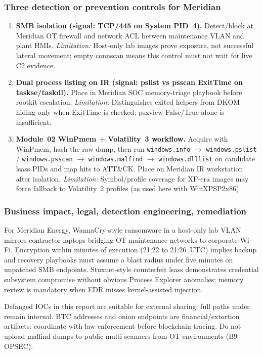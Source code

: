 \documentclass[11pt,letterpaper]{article}
\newcommand{\winpath}[1]{\texttt{\seqsplit{#1}}}
\begin{document}
\subsubsection*{Three detection or prevention controls for Meridian}
\begin{enumerate}
\item \textbf{SMB isolation (signal: TCP/445 on System PID~4).}
 Detect/block at Meridian OT firewall and network ACL
between maintenance VLAN and plant HMIs. \textit{Limitation:} Host-only lab images prove exposure, not successful
lateral movement; empty connscan means this control must not wait for live C2 evidence.
\item \textbf{Dual process listing on IR (signal: pslist vs psscan ExitTime on taskse/taskdl).}
 Place in Meridian SOC
memory-triage playbook before rootkit escalation. \textit{Limitation:} Distinguishes exited helpers from DKOM hiding
only when ExitTime is checked; psxview False/True alone is insufficient.
\item \textbf{Module~02 WinPmem + Volatility~3 workflow.} Acquire with WinPmem, hash the raw dump, then run
\texttt{windows.info} $\rightarrow$ \texttt{windows.pslist} / \texttt{windows.psscan} $\rightarrow$ \texttt{windows.malfind} $\rightarrow$
\texttt{windows.dlllist} on candidate lsass PIDs and map hits to ATT\&CK. Place on Meridian IR workstation after isolation.
\textit{Limitation:} Symbol/profile coverage for XP-era images may force fallback to Volatility~2 profiles (as used here
with WinXPSP2x86).
\end{enumerate}

\subsubsection*{Business impact, legal, detection engineering, remediation}
For Meridian Energy, WannaCry-style ransomware in a host-only lab VLAN mirrors contractor laptops bridging
OT maintenance networks to corporate Wi-Fi. Encryption within minutes of execution (21:22 to 21:26~UTC) implies
backup and recovery playbooks must assume a blast radius under five minutes on unpatched SMB endpoints.
Stuxnet-style counterfeit lsass demonstrates credential subsystem compromise without obvious Process Explorer
anomalies; memory review is mandatory when EDR misses kernel-assisted injection.

Defanged IOCs in this report are suitable for external sharing; full paths under
\winpath{C:/Intel/...} remain internal. BTC addresses and onion endpoints are financial/extortion artifacts:
coordinate with law enforcement before blockchain tracing. Do not upload malfind dumps to public
multi-scanners from OT environments (B9 OPSEC).
\end{document}
